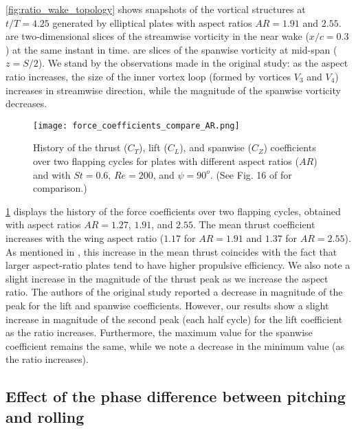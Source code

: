 \cref{fig:ratio_wake_topology} shows snapshots of the vortical structures at $t/T = 4.25$ generated by elliptical plates with aspect ratios $AR = 1.91$ and $2.55$.
 are two-dimensional slices of the streamwise vorticity in the near wake ($x/c = 0.3$) at the same instant in time.
 are slices of the spanwise vorticity at mid-span ($z = S/2$).
We stand by the observations made in the original study: as the aspect ratio increases, the size of the inner vortex loop (formed by vortices $V_3$ and $V_4$) increases in streamwise direction, while the magnitude of the spanwise vorticity decreases.

\begin{figure}[!h]
  \centering
  \texttt{[image: force\_coefficients\_compare\_AR.png]}
  \caption{History of the thrust ($C_T$), lift ($C_L$), and spanwise ($C_Z$) coefficients over two flapping cycles for plates with different aspect ratios ($AR$) and with $St = 0.6$, $Re = 200$, and $\psi = 90^o$. (See Fig. 16 of \citet{li_dong_2016} for comparison.)}
  \label{fig:ratio_force_coefficients}
\end{figure}

\cref{fig:ratio_force_coefficients} displays the history of the force coefficients over two flapping cycles, obtained with aspect ratios $AR = 1.27$, $1.91$, and $2.55$.
The mean thrust coefficient increases with the wing aspect ratio ($1.17$ for $AR = 1.91$ and $1.37$ for $AR = 2.55$).
As mentioned in \citet{li_dong_2016}, this increase in the mean thrust coincides with the fact that larger aspect-ratio plates tend to have higher propulsive efficiency.
We also note a slight increase in the magnitude of the thrust peak as we increase the aspect ratio.
The authors of the original study reported a decrease in magnitude of the peak for the lift and spanwise coefficients.
However, our results show a slight increase in magnitude of the second peak (each half cycle) for the lift coefficient as the ratio increases.
Furthermore, the maximum value for the spanwise coefficient remains the same, while we note a decrease in the minimum value (as the ratio increases).

\subsection{Effect of the phase difference between pitching and rolling}


